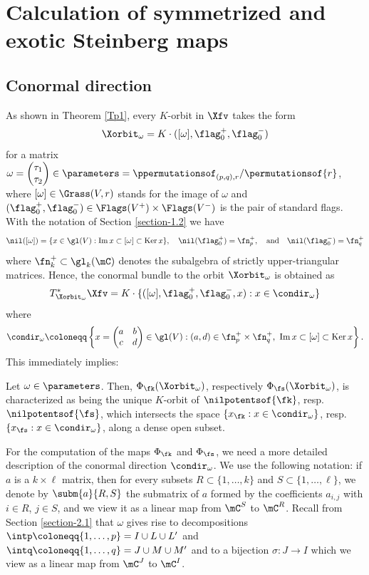 \section{Calculation of symmetrized and exotic Steinberg maps}

\label{section-4}

\subsection{Conormal direction}

As shown in Theorem \ref{Tp1}, every $K$-orbit in $\Xfv$ takes the form
\[
\Xorbit_\omega=K\cdot([\omega],\flag_0^+,\flag_0^-)
\]
for a matrix $\omega=\begin{pmatrix} \tau_1\\ \tau_2 \end{pmatrix}\in \parameters=\ppermutationsof_{(p,q),r}/\permutationsof{r}$,
where $[\omega]\in\Grass(V,r)$ stands for the image of $\omega$ and $(\flag_0^+,\flag_0^-)\in\Flags(V^+)\times \Flags(V^-)$ is the pair of standard flags.
With the notation of Section \ref{section-1.2} we have
\[\nil([\omega])=\{x\in\gl(V):\mathrm{Im}\,x\subset[\omega]\subset\mathrm{Ker}\,x\},\quad \nil(\flag_0^+)=\fn_p^+,\quad \mbox{and}\quad \nil(\flag_0^-)=\fn_q^+\]
where $\fn_k^+\subset\gl_k(\mC)$ denotes the subalgebra of strictly upper-triangular matrices.
Hence, the conormal bundle to the orbit $\Xorbit_\omega$ is obtained as
\[T^*_{\Xorbit_\omega}\Xfv=K\cdot\{([\omega],\flag_0^+,\flag_0^-,x):x\in\condir_\omega\}\]
where
\begin{equation}
\label{Domega}
\condir_\omega\coloneqq \left\{x=\begin{pmatrix} a & b\\ c & d\end{pmatrix}\in\gl(V):(a,d)\in\fn_p^+\times\fn_q^+,\ \mathrm{Im}\,x\subset[\omega]\subset\mathrm{Ker}\,x\right\}.
\end{equation}
This immediately implies:

\begin{lemma}
\label{L4.1}
Let $\omega\in\parameters$.
Then, $\Phi_\fk(\Xorbit_\omega)$, respectively $\Phi_\fs(\Xorbit_\omega)$,
is characterized as being the unique $K$-orbit of $\nilpotentsof{\fk}$, resp. $\nilpotentsof{\fs}$, which intersects the space $\{x_\fk:x\in\condir_\omega\}$, resp. $\{x_\fs:x\in\condir_\omega\}$, along a dense open subset.
\end{lemma}

For the computation of the maps $\Phi_\fk$ and $\Phi_\fs$, we need a more detailed description of the conormal direction $\condir_\omega$.
We use the following notation: if $a$ is a $k\times \ell$ matrix, then for every subsets $R\subset\{1,\ldots,k\}$ and $S\subset\{1,\ldots,\ell\}$, we denote by $\subm{a}{R,S}$ the submatrix of $a$ formed by the coefficients $a_{i,j}$ with $i\in R$, $j\in S$, and we view it as a linear map from $\mC^S$ to $\mC^R$. Recall from Section \ref{section-2.1}
that $\omega$ gives rise to decompositions $\intp\coloneqq \{1,\ldots,p\}=I\cup L\cup L'$ and $\intq\coloneqq \{1,\ldots,q\}=J\cup M\cup M'$ and to a bijection $\sigma:J\to I$ which we view as a linear map from $\mC^J$ to $\mC^I$.

